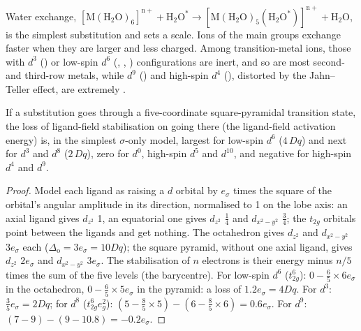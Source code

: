 Water exchange, $\mathrm{[M(H_2O)_6]^{n+} + H_2O^{\ast} \to [M(H_2O)_5(H_2O^{\ast})]^{n+} + H_2O}$, is the simplest
substitution and sets a scale. Ions of the main groups exchange faster when they
are larger and less charged. Among transition-metal ions, those with $d^3$
() or low-spin $d^6$ (, , ) configurations are inert, and so are
most second- and third-row metals, while $d^9$ () and high-spin $d^4$ (),
distorted by the Jahn--Teller effect, are extremely .

\begin{proposition}\label{prop:b3:complex-mechanisms:lfae}
If a substitution goes through a five-coordinate square-pyramidal transition
state, the loss of ligand-field stabilisation on going there (the ligand-field
activation energy) is, in the simplest $\sigma$-only model, largest for low-spin $d^6$
($4\,Dq$) and next for $d^3$ and $d^8$ ($2\,Dq$), zero for $d^0$, high-spin $d^5$ and $d^{10}$, and negative
for high-spin $d^4$ and $d^9$.
\end{proposition}

\begin{proof}
Model each ligand as raising a $d$ orbital by $e_\sigma$ times the square of the orbital's
angular amplitude in its direction, normalised to 1 on the lobe axis: an axial
ligand gives $d_{z^2}$ 1, an equatorial one gives $d_{z^2}$ $\frac14$ and $d_{x^2-y^2}$ $\frac34$; the $t_{2g}$ orbitals point
between the ligands and get nothing. The octahedron gives $d_{z^2}$ and $d_{x^2-y^2}$ $3e_\sigma$ each
($\Delta_{\mathrm o} = 3e_\sigma = 10Dq$); the square pyramid, without one axial ligand, gives $d_{z^2}$ $2e_\sigma$ and
$d_{x^2-y^2}$ $3e_\sigma$. The stabilisation of $n$ electrons is their energy minus $n/5$ times the sum of
the five levels (the barycentre). For low-spin $d^6$ ($t_{2g}^6$): $0 - \frac65 \times 6e_\sigma$ in the
octahedron, $0 - \frac65 \times 5e_\sigma$ in the pyramid: a loss of $1.2e_\sigma = 4Dq$. For $d^3$: $\frac35e_\sigma =
2Dq$; for $d^8$ ($t_{2g}^6e_g^2$): $(5 - \frac85 \times 5) - (6 - \frac85 \times 6) = 0.6e_\sigma$. For $d^9$: $(7 - 9) - (9 -
10.8) = -0.2e_\sigma$.
\end{proof}

